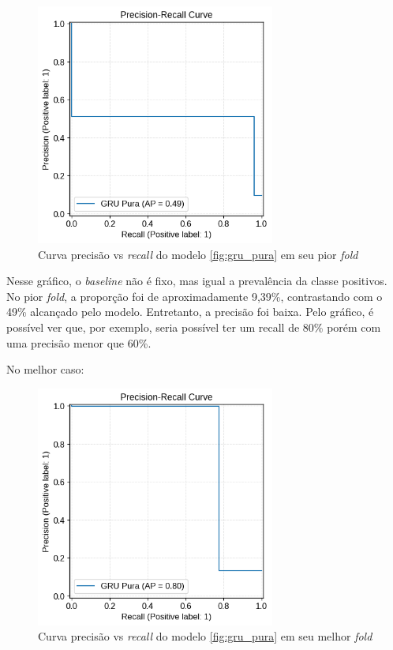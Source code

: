 \documentclass[
    12pt,                %
    openright,           %
    oneside,             %
    a4paper,             %
    brazil               %
]{abntex2}
\begin{document}
\begin{figure}[H]
  \centering
   \includegraphics[width=0.7\textwidth]{figuras/modelos_resultados/gru/ap_gru_pior_fold.png} %
  \caption{Curva precisão vs \textit{recall} do modelo \ref{fig:gru_pura} em seu pior \textit{fold}}
  \label{fig:ap_gru_pior_fold}
\end{figure}

Nesse gráfico, o \textit{baseline} não é fixo, mas igual a prevalência da classe positivos. No pior \textit{fold}, a proporção foi de aproximadamente
9,39\%, contrastando com o 49\% alcançado pelo modelo. Entretanto, a precisão foi baixa. Pelo gráfico, é possível ver que, por exemplo, seria 
possível ter um recall de 80\% porém com uma precisão menor que 60\%.

No melhor caso:

\begin{figure}[H]
  \centering
   \includegraphics[width=0.7\textwidth]{figuras/modelos_resultados/gru/ap_gru_melhor_fold.png} %
  \caption{Curva precisão vs \textit{recall} do modelo \ref{fig:gru_pura} em seu melhor \textit{fold}}
  \label{fig:ap_gru_melhor_fold}
\end{figure}
\end{document}
